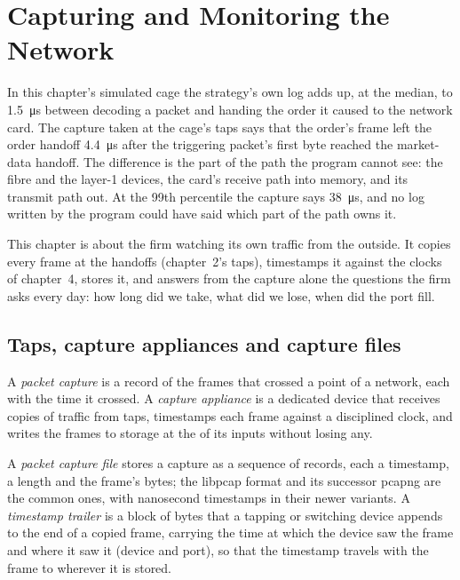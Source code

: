 \chapter{Capturing and Monitoring the Network}\label{ch:nw:capturing-and-monitoring-the-network}

In this chapter's simulated cage the strategy's own log adds up, at the median, to \qty{1.5}{\micro\second} between decoding a
packet and handing the order it caused to the network card. The capture taken at the cage's taps says that the order's frame left
the order handoff \qty{4.4}{\micro\second} after the triggering packet's first byte reached the market-data handoff. The difference is
the part of the path the program cannot see: the fibre and the layer-1 devices, the card's receive path into memory, and its
transmit path out. At the 99th percentile the capture says \qty{38}{\micro\second}, and no log written by the program could have
said which part of the path owns it.

This chapter is about the firm watching its own traffic from the outside. It copies every frame at the handoffs (chapter~2's taps),
timestamps it against the clocks of chapter~4, stores it, and answers from the capture alone the questions the firm asks every
day: how long did we take, what did we lose, when did the port fill.

\section{Taps, capture appliances and capture files}

\begin{definition}\label{def:nw:capturing-and-monitoring-the-network:capture}
A \emph{packet capture} is a record of the frames that crossed a point of a network, each with the time it
crossed. A \emph{capture appliance} is a dedicated device that receives copies of traffic from taps,
timestamps each frame against a disciplined clock, and writes the frames to storage at the  of its inputs without losing
any.
\end{definition}

\begin{definition}\label{def:nw:capturing-and-monitoring-the-network:trailer}
A \emph{packet capture file} stores a capture as a sequence of records, each a timestamp, a length and the
frame's bytes; the libpcap format and its successor pcapng are the common ones, with nanosecond timestamps in their newer variants.
A \emph{timestamp trailer} is a block of bytes that a tapping or switching device appends to the end of a
copied frame, carrying the time at which the device saw the frame and where it saw it (device and port), so that the timestamp
travels with the frame to wherever it is stored.
\end{definition}

